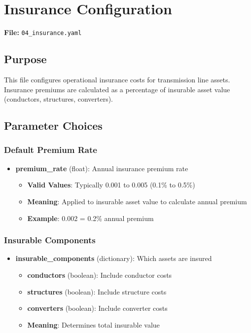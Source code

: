 \documentclass[ctcc_full_documentation.tex]{subfiles}
\begin{document}
\section{Insurance Configuration}
\label{sec:insurance}

\textbf{File:} \texttt{04\_insurance.yaml}

\subsection{Purpose}

This file configures operational insurance costs for transmission line assets. Insurance premiums are calculated as a percentage of insurable asset value (conductors, structures, converters).

\subsection{Parameter Choices}

\subsubsection{Default Premium Rate}

\begin{itemize}
    \item \textbf{premium\_rate} (float): Annual insurance premium rate
    \begin{itemize}
        \item \textbf{Valid Values}: Typically 0.001 to 0.005 (0.1\% to 0.5\%)
        \item \textbf{Meaning}: Applied to insurable asset value to calculate annual premium
        \item \textbf{Example}: 0.002 = 0.2\% annual premium
    \end{itemize}
\end{itemize}

\subsubsection{Insurable Components}

\begin{itemize}
    \item \textbf{insurable\_components} (dictionary): Which assets are insured
    \begin{itemize}
        \item \textbf{conductors} (boolean): Include conductor costs
        \item \textbf{structures} (boolean): Include structure costs
        \item \textbf{converters} (boolean): Include converter costs
        \item \textbf{Meaning}: Determines total insurable value
    \end{itemize}
\end{itemize}
\end{document}

